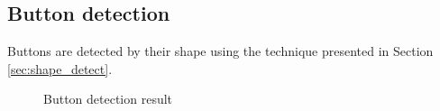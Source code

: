 \subsection{Button detection}
Buttons are detected by their shape using the technique presented in Section \ref{sec:shape_detect}.

	\begin{figure}[H]
	    \centering
	    

	    \caption{Button detection result}
		\label{fig:btn_detect}
	\end{figure}

